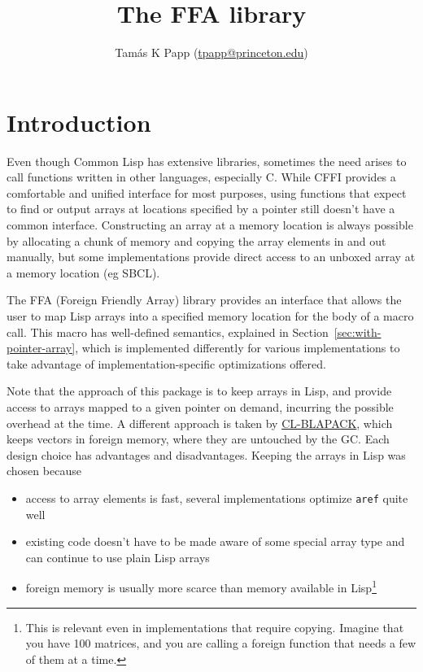 \documentclass[12pt,a4paper,dvipdfm]{article}
\begin{document}
\title{The FFA library}
\author{Tam\'as K Papp (\url{tpapp@princeton.edu})}
\maketitle

\section{Introduction}
\label{sec:motivation}

Even though Common Lisp has extensive libraries, sometimes the need
arises to call functions written in other languages, especially C.
While CFFI provides a comfortable and unified interface for most
purposes, using functions that expect to find or output arrays at
locations specified by a pointer still doesn't have a common
interface.  Constructing an array at a memory location is always
possible by allocating a chunk of memory and copying the array
elements in and out manually, but some implementations provide direct
access to an unboxed array at a memory location (eg SBCL).

The FFA (Foreign Friendly Array) library provides an interface that
allows the user to map Lisp arrays into a specified memory location
for the body of a macro call.  This macro has well-defined semantics,
explained in Section~\ref{sec:with-pointer-array}, which is
implemented differently for various implementations to take advantage
of implementation-specific optimizations offered.

Note that the approach of this package is to keep arrays in Lisp, and
provide access to arrays mapped to a given pointer on demand,
incurring the possible overhead at the time.  A different approach is
taken by
\href{http://middleangle.com/rif/derifatives/Home/21/cl-blapack-alpha-release}{CL-BLAPACK},
which keeps vectors in foreign memory, where they are untouched by the
GC.  Each design choice has advantages and disadvantages.  Keeping the
arrays in Lisp was chosen because
\begin{itemize}
\item access to array elements is fast, several implementations
  optimize \lstinline!aref! quite well
\item existing code doesn't have to be made aware of some special
  array type and can continue to use plain Lisp arrays
\item foreign memory is usually more scarce than memory available in
  Lisp\footnote{This is relevant even in implementations that require
    copying.  Imagine that you have 100 matrices, and you are calling
    a foreign function that needs a few of them at a time.}
\end{itemize}
\end{document}
